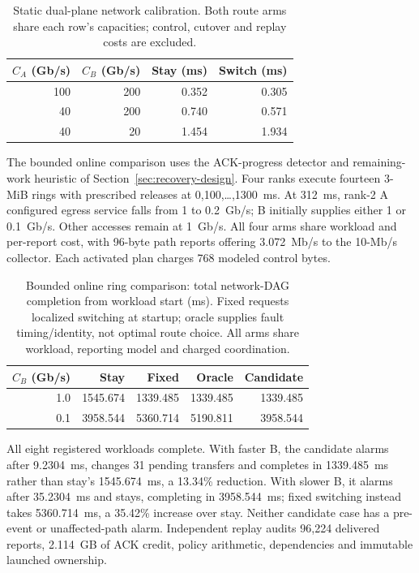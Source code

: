 \documentclass[sigconf]{acmart}
\begin{document}
\begin{table}[t]
  \caption{Static dual-plane network calibration. Both route arms share
  each row's capacities; control, cutover and replay costs are excluded.}
  \label{tab:dual-calibration}
  \centering
  \small
  \begin{tabular}{@{}rrrr@{}}
    \toprule
    $C_A$ (Gb/s) & $C_B$ (Gb/s) & Stay (ms) & Switch (ms) \\
    \midrule
    100 & 200 & 0.352 & 0.305 \\
    40 & 200 & 0.740 & 0.571 \\
    40 & 20 & 1.454 & 1.934 \\
    \bottomrule
  \end{tabular}
\end{table}

The bounded online comparison uses the ACK-progress detector and
remaining-work heuristic of Section~\ref{sec:recovery-design}. Four ranks
execute fourteen 3-MiB rings with prescribed releases at
0,100,\ldots,1300~ms. At 312~ms, rank-2 A configured egress service falls
from 1 to 0.2~Gb/s; B initially supplies either 1 or 0.1~Gb/s. Other
accesses remain at 1~Gb/s. All four arms share workload and per-report
cost, with 96-byte path reports offering 3.072~Mb/s to the 10-Mb/s
collector. Each activated plan charges 768 modeled control bytes.

\begin{table}[t]
\caption{Bounded online ring comparison: total network-DAG completion
from workload start (ms). Fixed requests localized switching at startup;
oracle supplies fault timing/identity, not optimal route choice. All arms
share workload, reporting model and charged coordination.}
\label{tab:online-route}
\centering\small
\begin{tabular}{@{}rrrrr@{}}
\toprule
$C_B$ (Gb/s) & Stay & Fixed & Oracle & Candidate\\
\midrule
1.0 & 1545.674 & 1339.485 & 1339.485 & 1339.485\\
0.1 & 3958.544 & 5360.714 & 5190.811 & 3958.544\\
\bottomrule
\end{tabular}
\end{table}

All eight registered workloads complete. With faster B, the candidate
alarms after 9.2304~ms, changes 31 pending transfers and completes in
1339.485~ms rather than stay's 1545.674~ms, a 13.34\% reduction. With
slower B, it alarms after 35.2304~ms and stays, completing in 3958.544~ms;
fixed switching instead takes 5360.714~ms, a 35.42\% increase over stay.
Neither candidate case has a pre-event or unaffected-path alarm.
Independent replay audits 96,224 delivered reports, 2.114~GB of ACK
credit, policy arithmetic, dependencies and immutable launched ownership.
\end{document}
